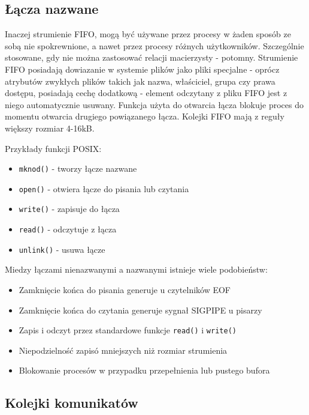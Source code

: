 \subsection{Łącza nazwane}

Inaczej strumienie FIFO, mogą być używane przez procesy w żaden sposób ze sobą nie spokrewnione, a nawet przez procesy różnych użytkowników. Szczególnie stosowane, gdy nie można zastosować relacji macierzysty - potomny. Strumienie FIFO posiadają dowiazanie w systemie plików jako pliki specjalne - oprócz atrybutów zwykłych plików takich jak nazwa, właściciel, grupa czy prawa dostępu, posiadają cechę dodatkową - element odczytany z pliku FIFO jest z niego automatycznie usuwany. Funkcja użyta do otwarcia łącza blokuje proces do momentu otwarcia drugiego powiązanego łącza. Kolejki FIFO mają z reguły większy rozmiar 4-16kB.

Przykłady funkcji POSIX:
\begin{itemize}
	\item \texttt{mknod()} - tworzy łącze nazwane
    \item \texttt{open()} - otwiera łącze do pisania lub czytania
    \item \texttt{write()} - zapisuje do łącza
    \item \texttt{read()} - odczytuje z łącza
    \item \texttt{unlink()} - usuwa łącze
\end{itemize}

\newpage

Miedzy łączami nienazwanymi a nazwanymi istnieje wiele podobieństw:
\begin{itemize}
	\item Zamknięcie końca do pisania generuje u czytelników EOF
    \item Zamknięcie końca do czytania generuje sygnał SIGPIPE u pisarzy
    \item Zapis i odczyt przez standardowe funkcje \texttt{read()} i \texttt{write()}
    \item Niepodzielność zapisó mniejszych niż rozmiar strumienia
    \item Blokowanie procesów w przypadku przepełnienia lub pustego bufora
\end{itemize}

\subsection{Kolejki komunikatów}

